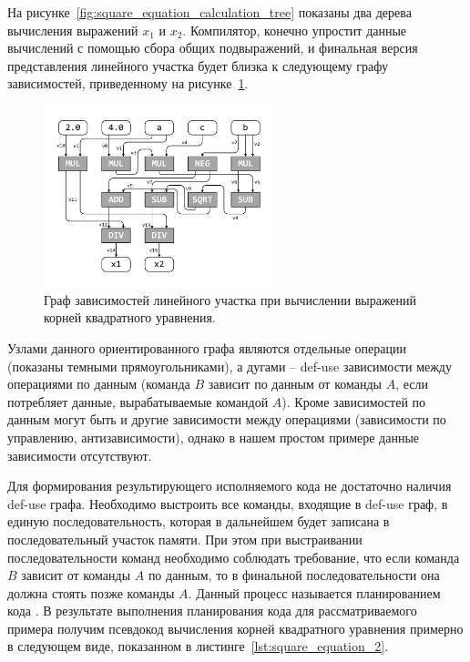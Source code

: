 \documentclass[
11pt,%
tightenlines,%
twoside,%
onecolumn,%
nofloats,%
nobibnotes,%
nofootinbib,%
superscriptaddress,%
noshowpacs,%
centertags]%
{revtex4}
\begin{document}
На рисунке~\ref{fig:square_equation_calculation_tree} показаны два дерева вычисления выражений $x_1$ и $x_2$.
Компилятор, конечно упростит данные вычислений с помощью сбора общих подвыражений, и финальная версия представления линейного участка будет близка к следующему графу зависимостей, приведенному на рисунке~\ref{fig:def_use}.

\begin{figure}[h]
\setcaptionmargin{5mm}
\onelinecaptionsfalse %
\includegraphics[width=0.60\textwidth]{pics/def_use.pdf}
\caption{Граф зависимостей линейного участка при вычислении выражений\\ корней квадратного уравнения.}\label{fig:def_use}
\end{figure}

Узлами данного ориентированного графа являются отдельные операции (показаны темными прямоугольниками), а дугами -- def-use зависимости между операциями по данным (команда $B$ зависит по данным от команды $A$, если потребляет данные, вырабатываемые командой $A$).
Кроме зависимостей по данным могут быть и другие зависимости между операциями (зависимости по управлению, антизависимости), однако в нашем простом примере данные зависимости отсутствуют.

Для формирования результирующего исполняемого кода не достаточно наличия def-use графа.
Необходимо выстроить все команды, входящие в def-use граф, в единую последовательность, которая в дальнейшем будет записана в последовательный участок памяти.
При этом при выстраивании последовательности команд необходимо соблюдать требование, что если команда $B$ зависит от команды $A$ по данным, то в финальной последовательности она должна стоять позже команды $A$.
Данный процесс называется планированием кода \cite{Aho}.
В результате выполнения планирования кода для рассматриваемого примера получим псевдокод вычисления корней квадратного уравнения примерно в следующем виде, показанном в листинге~\ref{lst:square_equation_2}.
\end{document}

